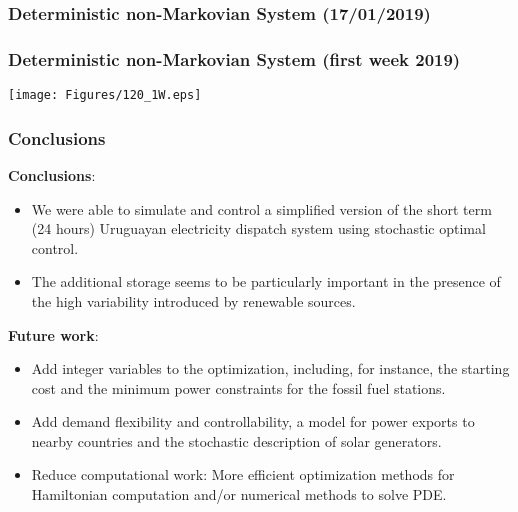 
\begin{frame}
\frametitle{Deterministic non-Markovian System (17/01/2019)}
\begin{figure}[ht!]
\centering
{}\quad
{}
\end{figure}
\end{frame}


\begin{frame}
\frametitle{Deterministic non-Markovian System (first week 2019)}
\centering
\texttt{[image: Figures/120\_1W.eps]}
\end{frame}


\begin{frame}
\frametitle{Conclusions}
\textbf{Conclusions}:
\begin{itemize}
\item We were able to simulate and control a simplified version of the short term (24 hours) Uruguayan electricity dispatch system using stochastic optimal control.
\item The additional storage seems to be particularly important in the presence of the high variability introduced by renewable sources.
\end{itemize}
\textbf{Future work}:
\begin{itemize}
\item Add integer variables to the optimization, including, for instance, the starting cost and the minimum power constraints for the fossil fuel stations.
\item Add demand flexibility and controllability, a model for  power exports to nearby countries and the stochastic description of solar generators.
\item Reduce computational work: More efficient optimization methods for Hamiltonian computation and/or numerical methods to solve PDE.
\end{itemize}
\end{frame}

